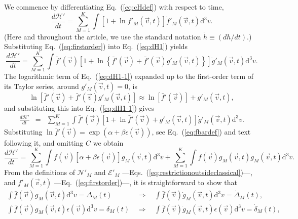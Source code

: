 We commence by differentiating Eq.~(\ref{eq:cHdef}) with respect to time,
%
\begin{equation}\label{eq:dH1}
    \frac{d\mathcal{H}'}{dt}=\sum_{M=1}^{K}\int\left[
      1+\ln f'_M(\vec{v},t)
    \right]\dot f'_M(\vec{v},t)\mathrm{d}^3v.
\end{equation}
%
(Here and throughout the article, we use the standard notation $\dot h\equiv(dh/dt)$.)
Substituting Eq.~(\ref{eq:firstorder}) into Eq.~(\ref{eq:dH1}) yields
%
\begin{equation}\label{eq:dH1-1}
    \frac{d\mathcal{H}'}{dt}=\sum_{M=1}^{K}\int\bar f'(\vec{v}) \left[
      1+\ln \left\{
        \bar f'(\vec{v})+\bar f'(\vec{v})g'_M(\vec{v},t)
      \right\}
    \right]\dot g'_M(\vec{v},t)\mathrm{d}^3v.
\end{equation}
%
The logarithmic term of Eq.~(\ref{eq:dH1-1}) expanded up to the first-order term
of its Taylor series, around $g'_{M}(\vec{v},t)=0$, is
%
\begin{equation}\label{lnapproximationclassical}
    \ln [\bar{f}'(\vec{v})+\bar{f}'(\vec{v}) g'_{M}(\vec{v},t)] \approx
    \ln [\bar{f}'(\vec{v})]+ g'_{M}(\vec{v},t),
\end{equation}
%
and substituting this into Eq.~(\ref{eq:dH1-1}) gives
%
\begin{eqnarray}
    \frac{d\mathcal{H}'}{dt}&=&\sum_{M=1}^{K} \int \bar f'(\vec{v})\left[
      1+\ln \bar f'(\vec{v})+g'_M(\vec{v},t)
    \right]\dot g'_M(\vec{v},t)\mathrm{d}^3v.
\end{eqnarray}
%
Substituting $\ln \bar f'(\vec{v})=\exp\left(\alpha+\beta \epsilon(\vec{v})\right)$,
see Eq.~(\ref{eq:fbardef}) and text following it, and omitting $C$ we obtain
%
\begin{equation}\label{eq:dH1-2}
    \frac{d\mathcal{H}'}{dt} = \sum_{M=1}^{K}\int\bar f(\vec{v})\left[
      \alpha+\beta \epsilon(\vec{v})
    \right]\dot g_M(\vec{v},t)\mathrm{d}^3v +\sum_{M=1}^{K}
    \int\bar f(\vec{v})g_M(\vec{v},t)\dot g_M(\vec{v},t)\mathrm{d}^3v .
\end{equation}
%
From the definitions of $\mathcal{N}'_M$ and $\mathcal{E}'_M$ 
---Eqs.~(\ref{eq:restrictionoutsideclassical})---, and $f'_{M}(\vec{v},t)$
---Eq.~(\ref{eq:firstorder})---, it is straightforward to show that
%
\begin{subequations}\label{eq:classsumdotdeltaseq0}
\begin{eqnarray}
    \int \bar{f}(\vec{v}) g_{M}(\vec{v},t) \mathrm{d}^{3}v=\Delta_M(t) \ \  &\Rightarrow&
    \ \  \int \bar{f}(\vec{v}) \dot{g}_{M}(\vec{v},t)\mathrm{d}^{3}v=\dot{\Delta}_M(t), \\
    \int  \bar{f}(\vec{v}) g_{M}(\vec{v},t)\epsilon(\vec{v}) \mathrm{d}^{3}v=\delta_M(t) \ \  &\Rightarrow&
    \ \  \int \bar{f}(\vec{v}) \dot{g}_{M}(\vec{v},t)\epsilon(\vec{v}) \mathrm{d}^{3}v=\dot{\delta}_M(t),
\end{eqnarray}
\end{subequations}
